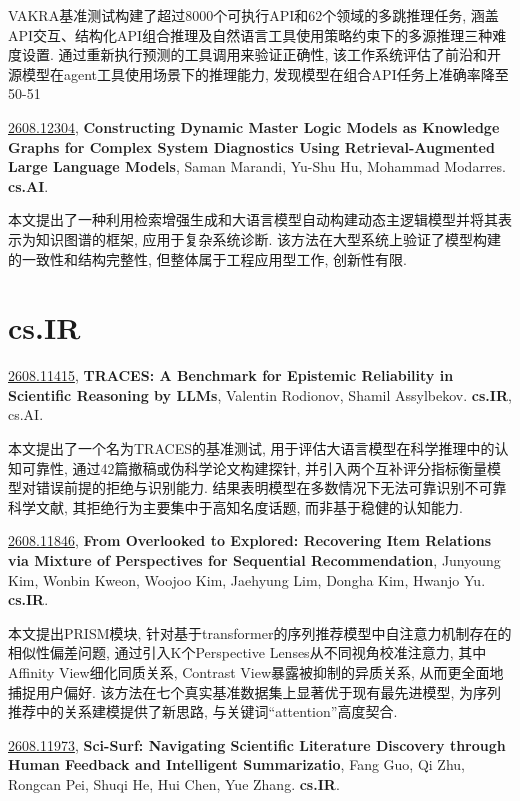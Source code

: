 \documentclass[9pt, a4paper]{article}
\theoremstyle{plain}
\theoremstyle{definition}
\theoremstyle{remark}
\newcommand{\arxivwithtarget}[3]{\hypertarget{#1}{}\href{https://arxiv.org/abs/#1}{#1}, \textbf{\textcolor{arxivblue}{#2}}, #3. }
\begin{document}
VAKRA基准测试构建了超过8000个可执行API和62个领域的多跳推理任务, 涵盖API交互、结构化API组合推理及自然语言工具使用策略约束下的多源推理三种难度设置. 通过重新执行预测的工具调用来验证正确性, 该工作系统评估了前沿和开源模型在agent工具使用场景下的推理能力, 发现模型在组合API任务上准确率降至50-51%


\arxivwithtarget{2608.12304}{Constructing Dynamic Master Logic Models as Knowledge Graphs for Complex System Diagnostics Using Retrieval-Augmented Large Language Models}{Saman Marandi, Yu-Shu Hu, Mohammad Modarres}\textbf{cs.AI}.

本文提出了一种利用检索增强生成和大语言模型自动构建动态主逻辑模型并将其表示为知识图谱的框架, 应用于复杂系统诊断. 该方法在大型系统上验证了模型构建的一致性和结构完整性, 但整体属于工程应用型工作, 创新性有限.


\section{cs.IR}
\arxivwithtarget{2608.11415}{TRACES: A Benchmark for Epistemic Reliability in Scientific Reasoning by LLMs}{Valentin Rodionov, Shamil Assylbekov}\textbf{cs.IR}, cs.AI.

本文提出了一个名为TRACES的基准测试, 用于评估大语言模型在科学推理中的认知可靠性, 通过42篇撤稿或伪科学论文构建探针, 并引入两个互补评分指标衡量模型对错误前提的拒绝与识别能力. 结果表明模型在多数情况下无法可靠识别不可靠科学文献, 其拒绝行为主要集中于高知名度话题, 而非基于稳健的认知能力.


\arxivwithtarget{2608.11846}{From Overlooked to Explored: Recovering Item Relations via Mixture of Perspectives for Sequential Recommendation}{Junyoung Kim, Wonbin Kweon, Woojoo Kim, Jaehyung Lim, Dongha Kim, Hwanjo Yu}\textbf{cs.IR}.

本文提出PRISM模块, 针对基于transformer的序列推荐模型中自注意力机制存在的相似性偏差问题, 通过引入K个Perspective Lenses从不同视角校准注意力, 其中Affinity View细化同质关系, Contrast View暴露被抑制的异质关系, 从而更全面地捕捉用户偏好. 该方法在七个真实基准数据集上显著优于现有最先进模型, 为序列推荐中的关系建模提供了新思路, 与关键词“attention”高度契合.


\arxivwithtarget{2608.11973}{Sci-Surf: Navigating Scientific Literature Discovery through Human Feedback and Intelligent Summarizatio}{Fang Guo, Qi Zhu, Rongcan Pei, Shuqi He, Hui Chen, Yue Zhang}\textbf{cs.IR}.
\end{document}
